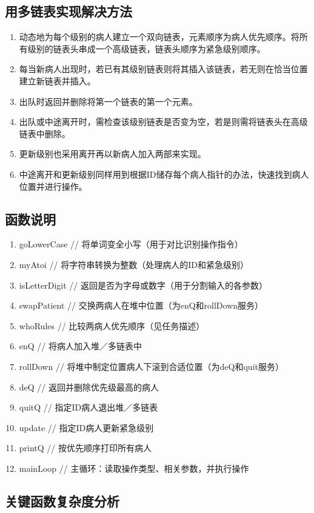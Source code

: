 \documentclass{homework}
\begin{document}
\subsection{用多链表实现解决方法}
\begin{enumerate}
    \item 动态地为每个级别的病人建立一个双向链表，元素顺序为病人优先顺序。将所有级别的链表头串成一个高级链表，链表头顺序为紧急级别顺序。
    \item 每当新病人出现时，若已有其级别链表则将其插入该链表，若无则在恰当位置建立新链表并插入。
    \item 出队时返回并删除将第一个链表的第一个元素。
    \item 出队或中途离开时，需检查该级别链表是否变为空，若是则需将链表头在高级链表中删除。
    \item 更新级别也采用离开再以新病人加入两部来实现。
    \item 中途离开和更新级别同样用到根据ID储存每个病人指针的办法，快速找到病人位置并进行操作。
\end{enumerate}
\subsection{函数说明}
\begin{enumerate}
    \item goLowerCase // 将单词变全小写（用于对比识别操作指令）
    \item myAtoi // 将字符串转换为整数（处理病人的ID和紧急级别）
    \item isLetterDigit // 返回是否为字母或数字（用于分割输入的各参数）
    \item swapPatient // 交换两病人在堆中位置（为enQ和rollDown服务）
    \item whoRules // 比较两病人优先顺序（见任务描述）
    \item enQ // 将病人加入堆／多链表中
    \item rollDown // 将堆中制定位置病人下滚到合适位置（为deQ和quit服务）
    \item deQ // 返回并删除优先级最高的病人
    \item quitQ // 指定ID病人退出堆／多链表
    \item update // 指定ID病人更新紧急级别
    \item printQ // 按优先顺序打印所有病人
    \item mainLoop // 主循环：读取操作类型、相关参数，并执行操作
\end{enumerate}
\subsection{关键函数复杂度分析}
\end{document}
